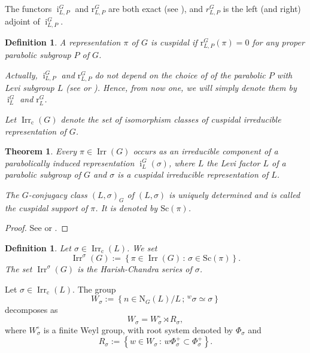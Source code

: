 \documentclass[12pt]{amsart}
\numberwithin{equation}{subsection}
\newtheorem{defn}[equation]{Definition}
\newtheorem{thm}[equation]{Theorem}
\newcommand{\rr}{\operatorname{r}}
\newcommand{\ii}{\operatorname{i}}
\newcommand{\Irr}{\operatorname{Irr}}
\newcommand{\rN}{{\mathrm{N}}}
\newcommand{\Sc}{\mathrm{Sc}}
\newcommand{\cc}{\mathrm{c}}
\def\cc{\mathrm{sc}}
\def\rr{{\mathrm{r}}}
\def\cc{{\mathrm{c}}}
\begin{document}
The functors $\ii_{L,P}^G$ and $\rr_{L,P}^G$ are both exact (see \cite[Corollary 3.1.6]{GMbook}), and $r_{L,P}^G$ is the left (and right) adjoint of $\ii_{L,P}^G$.

\begin{defn} {\rm
A representation $\pi$ of $G$ is \textit{cuspidal} if $\rr_{L,P}^G(\pi)=0$ for any proper parabolic subgroup $P$ of $G$.

Actually, $\ii_{L,P}^G$ and $\rr_{L,P}^G$ do not depend on the choice of of the parabolic $P$ with Levi subgroup $L$ (see \cite[Theorem 5.3.1]{DMbook} or \cite[Theorem 3.1.13]{GMbook}). Hence, from now one, we will simply denote them by $\ii_{L}^G$ and $\rr_{L}^G$.

Let $\Irr_\cc(G)$ denote the set of isomorphism classes of cuspidal irreducible representation of $G$.}
\end{defn}

\begin{thm} 
Every $\pi\in\Irr(G)$  occurs as an irreducible component of a parabolically induced representation $\ii_{L}^G(\sigma)$, where $L$ the Levi factor $L$ of a parabolic subgroup of $G$ and $\sigma$ is a cuspidal irreducible  representation of $L$.

\smallskip
\noindent
The  $G$-conjugacy class $(L,\sigma)_G$ of $(L,\sigma)$ is uniquely determined and is  called the \textit{cuspidal support} of $\pi$. It is denoted by $\Sc(\pi)$.
\end{thm}
\begin{proof} See  \cite[\S5.3]{DMbook} or \cite[Corollary 3.1.17]{GMbook}.
\end{proof}

\begin{defn}{\rm
Let $\sigma\in\Irr_\cc(L)$. We set
\begin{equation} \label{eqn:HCs}
\Irr^\sigma(G):=\left\{\pi\in\Irr(G)\,:\,\sigma\in\Sc(\pi)\right\}.
\end{equation}
The set $\Irr^\sigma(G)$ is the \textit{Harish-Chandra series} of $\sigma$.}
\end{defn}

Let $\sigma\in\Irr_\cc(L)$. The group
\begin{equation} \label{eqn:Wsigma} 
W_{\sigma}:=\left\{n\in\rN_G(L)/L\,;\,{}^w\sigma\simeq\sigma\right\}
\end{equation}
decomposes as 
\begin{equation} \label{eqn:Dec} 
W_{\sigma}=W_{\sigma}^\circ\rtimes R_{\sigma},
\end{equation}
where $W_{\sigma}^\circ$ is a finite Weyl group, with root system denoted by $\Phi_{\sigma}$ and 
\begin{equation} \label{eqn:Rsigma} 
R_{\sigma}:=\left\{w\in W_{\sigma}\,:\, w \Phi_{\sigma}^+\subset \Phi_{\sigma}^+\right\}.
\end{equation}
\end{document}
